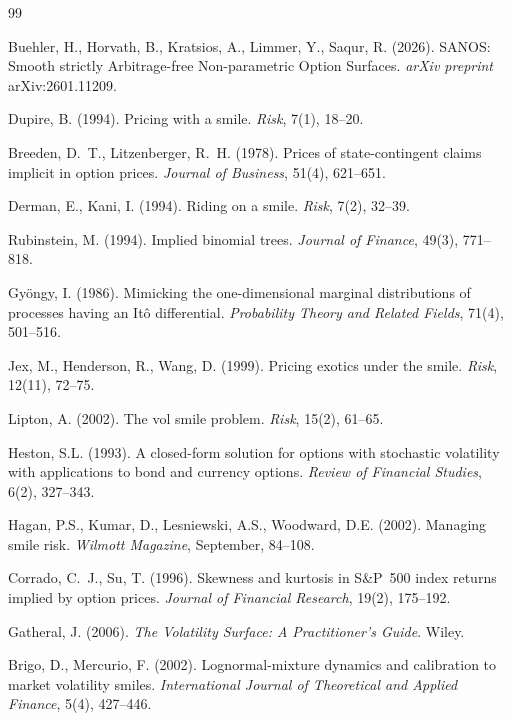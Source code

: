 \documentclass[11pt]{article}
\begin{document}
\begin{thebibliography}{99}

Buehler, H., Horvath, B., Kratsios, A., Limmer, Y., Saqur, R. (2026).
SANOS: Smooth strictly Arbitrage-free Non-parametric Option Surfaces.
\textit{arXiv preprint} arXiv:2601.11209.

Dupire, B. (1994). Pricing with a smile. \textit{Risk}, 7(1), 18--20.

Breeden, D.~T., Litzenberger, R.~H. (1978). Prices of state-contingent claims implicit in
option prices. \textit{Journal of Business}, 51(4), 621--651.

Derman, E., Kani, I. (1994). Riding on a smile. \textit{Risk}, 7(2), 32--39.

Rubinstein, M. (1994). Implied binomial trees.
\textit{Journal of Finance}, 49(3), 771--818.

Gy\"ongy, I. (1986).
Mimicking the one-dimensional marginal distributions of processes having an It\^o
differential.
\textit{Probability Theory and Related Fields}, 71(4), 501--516.

Jex, M., Henderson, R., Wang, D. (1999).
Pricing exotics under the smile. \textit{Risk}, 12(11), 72--75.

Lipton, A. (2002). The vol smile problem. \textit{Risk}, 15(2), 61--65.

Heston, S.L. (1993).
A closed-form solution for options with stochastic volatility with applications to
bond and currency options.
\textit{Review of Financial Studies}, 6(2), 327--343.

Hagan, P.S., Kumar, D., Lesniewski, A.S., Woodward, D.E. (2002).
Managing smile risk. \textit{Wilmott Magazine}, September, 84--108.

Corrado, C.~J., Su, T. (1996). Skewness and kurtosis in S\&P~500 index returns implied by option prices. \emph{Journal of Financial Research}, 19(2), 175--192.

Gatheral, J. (2006).
\textit{The Volatility Surface: A Practitioner's Guide}. Wiley.

Brigo, D., Mercurio, F. (2002).
Lognormal-mixture dynamics and calibration to market volatility smiles.
\textit{International Journal of Theoretical and Applied Finance}, 5(4), 427--446.


\end{thebibliography}
\end{document}
